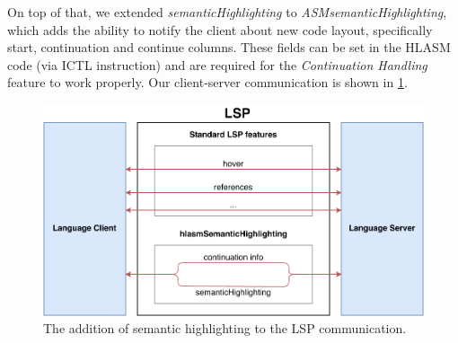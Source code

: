 On top of that, we extended \emph{semanticHighlighting} to \emph{ASMsemanticHighlighting}, which adds the ability to notify the client about new code layout, specifically start, continuation and continue columns. These fields can be set in the HLASM code (via ICTL instruction) and are required for the \emph{Continuation Handling} feature to work properly. Our client-server communication is shown in \cref{fig08:lsp}.


\begin{figure}
	\centering
	\includegraphics[width=\textwidth]{img/lsp_addition}
	\caption{The addition of semantic highlighting to the LSP communication.}
	
	\label{fig08:lsp}
\end{figure}



